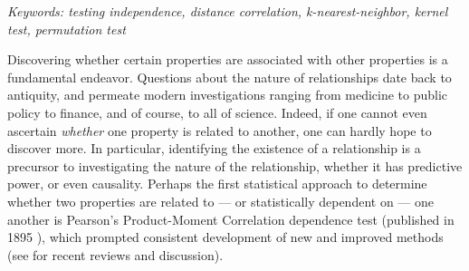 \documentclass[11pt]{article}
\begin{document}
\noindent%
{\it Keywords: testing independence, distance correlation, k-nearest-neighbor, kernel test, permutation test}

\clearpage
\setcounter{tocdepth}{2}%









Discovering whether certain properties are associated with other properties is a fundamental endeavor. Questions about the nature of relationships date back to antiquity, and permeate modern investigations ranging from medicine to public policy to finance, and of course, to all of science.
Indeed, if one cannot even ascertain  \emph{whether} one property is related to another, one can hardly hope to discover more.  In particular, identifying the existence of a relationship is a precursor to investigating the nature of the relationship, whether it has predictive power, or even causality.
% 
Perhaps the first statistical approach to determine whether two properties are related to --- or statistically dependent on --- one another is Pearson's Product-Moment Correlation dependence test  (published in 1895 \cite{Pearson1895}), which prompted consistent development of  new and improved methods (see \cite{Reimherr2013,JosseHolmes2013} for  recent reviews and discussion).
\end{document}
